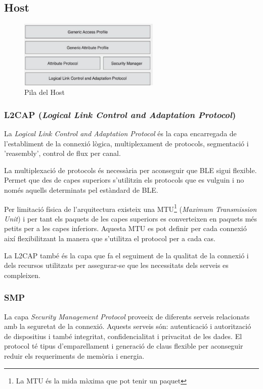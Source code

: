 
\subsection{Host}
	\begin{figure}[h!]
		\begin{center}
			\includegraphics[width=0.6\textwidth]{./images/host.png}
			\caption{Pila del Host}
	\end{center}
\end{figure}

\subsubsection{L2CAP (\textit{Logical Link Control and Adaptation Protocol})}
La \textit{Logical Link Control and Adaptation Protocol} és la capa encarregada de l'establiment de la connexió lògica, multiplexament de protocols, segmentació i 'reasembly', control de flux per canal.

La multiplexació de protocols és necessària per aconseguir que BLE sigui flexible.
Permet que des de capes superiors s'utilitzin els protocols que es vulguin i no només aquells determinats pel estàndard de BLE.

Per limitació física de l'arquitectura existeix una MTU\footnote{La MTU és la mida màxima que pot tenir un paquet} (\textit{Maximum Transmission Unit}) i per tant els paquets de les capes superiors es converteixen en paquets més petits per a les capes inferiors.
Aquesta MTU es pot definir per cada connexió així flexibilitzant la manera que s'utilitza el protocol per a cada cas.

La L2CAP també és la capa que fa el seguiment de la qualitat de la connexió i dels recursos utilitzats per assegurar-se que les necessitats dels serveis es compleixen.

\subsubsection{SMP}
La capa \textit{Security Management Protocol} proveeix de diferents serveis relacionats amb la seguretat de la connexió.
Aquests serveis són: autenticació i autorització de dispositius i també integritat, confidencialitat i privacitat de les dades.
El protocol té tipus d'emparellament i generació de claus flexible per aconseguir reduir els requeriments de memòria i energia.

